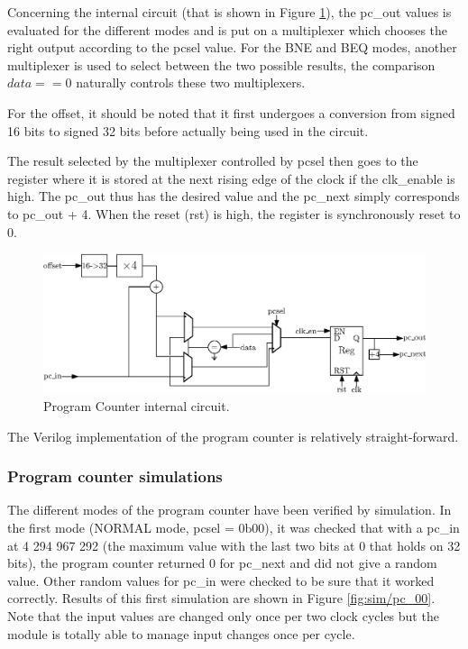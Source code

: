 Concerning the internal circuit (that is shown in Figure \ref{fig:components/pc_in}), the pc\_out 
values is evaluated for the different modes and 
is put on a multiplexer which chooses the right output according to the pcsel value. For the BNE 
and BEQ modes, another multiplexer is used to select between the two possible results, the comparison $data == 0$ naturally controls these two multiplexers. 

For the offset, it should be noted that it first undergoes a conversion from
signed 16 bits to signed 32 bits before actually being used in the circuit.

The result selected by the multiplexer controlled by pcsel then goes to the register where it is 
stored at the next rising edge of the clock if the clk\_enable is high. The 
pc\_out thus has the desired value and the pc\_next simply corresponds to pc\_out + 4. When 
the reset (rst) is high, the register is synchronously reset to 0.

\begin{figure}[H]
    \centering
    \includegraphics[width=\linewidth]{Chapter3-CPU/res/pc_internal}
    \caption{Program Counter internal circuit.}
    \label{fig:components/pc_in}
\end{figure}


The Verilog implementation of the program counter is relatively straight-forward.

\subsubsection*{Program counter simulations}

The different modes of the program counter have been verified by simulation. In the first mode 
(NORMAL mode, pcsel = 0b00), it was checked that with a pc\_in at 4 294 967 292 (the maximum value with 
the last two bits at 0 that holds on 32 bits), the program counter returned 0 for pc\_next and did not 
give a random value. Other random values for pc\_in were checked to be sure that it worked 
correctly. Results of this first simulation are shown in Figure \ref{fig:sim/pc_00}. Note that the
input values are changed only once per two clock cycles but the module is totally able to manage
input changes once per cycle.

